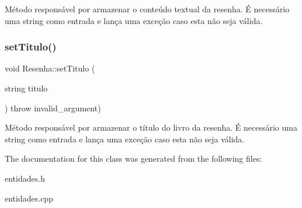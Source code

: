 Método responsável por armazenar o conteúdo textual da resenha. É necessário uma string como entrada e lança uma exceção caso esta não seja válida. \mbox{\label{classResenha_a4f2bf94388381e3ce05fe5d63ac23e4f}} 
\subsubsection{\texorpdfstring{set\+Titulo()}{setTitulo()}}
{\footnotesize\ttfamily void Resenha\+::set\+Titulo (\begin{DoxyParamCaption}\item[{string}]{titulo }\end{DoxyParamCaption}) throw  invalid\+\_\+argument) }

Método responsável por armazenar o título do livro da resenha. É necessário uma string como entrada e lança uma exceção caso esta não seja válida. 

The documentation for this class was generated from the following files\+:\begin{DoxyCompactItemize}
\item 
entidades.\+h\item 
entidades.\+cpp\end{DoxyCompactItemize}
